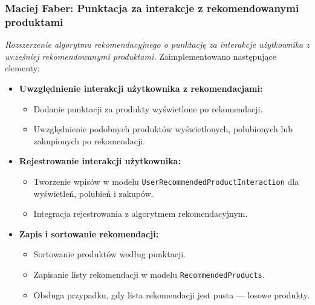 \documentclass[12pt,a4paper,oneside]{article}
\theoremstyle{definition}
\numberwithin{equation}{section}
\begin{document}
\subsubsection{Maciej Faber: Punktacja za interakcje z rekomendowanymi produktami}
\label{section:1.3.52}
\textit{
Rozszerzenie algorytmu rekomendacyjnego o punktację za interakcje użytkownika z wcześniej rekomendowanymi produktami.
}
Zaimplementowano następujące elementy:
\begin{itemize}
    \item \textbf{Uwzględnienie interakcji użytkownika z rekomendacjami:}
    \begin{itemize}
        \item Dodanie punktacji za produkty wyświetlone po rekomendacji.
        \item Uwzględnienie podobnych produktów wyświetlonych, polubionych lub zakupionych po rekomendacji.
    \end{itemize}
    \item \textbf{Rejestrowanie interakcji użytkownika:}
    \begin{itemize}
        \item Tworzenie wpisów w modelu \texttt{UserRecommendedProductInteraction} dla wyświetleń, polubień i zakupów.
        \item Integracja rejestrowania z algorytmem rekomendacyjnym.
    \end{itemize}
    \item \textbf{Zapis i sortowanie rekomendacji:}
    \begin{itemize}
        \item Sortowanie produktów według punktacji.
        \item Zapisanie listy rekomendacji w modelu \texttt{RecommendedProducts}.
        \item Obsługa przypadku, gdy lista rekomendacji jest pusta — losowe produkty.
    \end{itemize}
\end{itemize}
\end{document}
